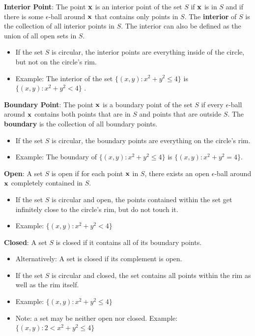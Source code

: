 \documentclass[]{book}
\providecommand{\tightlist}{%
  \setlength{\itemsep}{0pt}\setlength{\parskip}{0pt}}
\theoremstyle{definition}
\theoremstyle{definition}
\theoremstyle{definition}
\theoremstyle{remark}
\begin{document}
\textbf{Interior Point}: The point \(\bf x\) is an interior point of the set \(S\) if \(\bf x\) is in \(S\) and if there is some \(\epsilon\)-ball around \(\bf x\) that contains only points in \(S\). The \textbf{interior} of \(S\) is the collection of all interior points in \(S\). The interior can also be defined as the union of all open sets in \(S\).

\begin{itemize}
\tightlist
\item
  If the set \(S\) is circular, the interior points are everything inside of the circle, but not on the circle's rim.
\item
  Example: The interior of the set \(\{ (x,y) : x^2+y^2\le 4 \}\) is \(\{ (x,y) : x^2+y^2< 4 \}\) .
\end{itemize}

\textbf{Boundary Point}: The point \(\bf x\) is a boundary point of the set \(S\) if every \(\epsilon\)-ball around \(\bf x\) contains both points that are in \(S\) and points that are outside \(S\). The \textbf{boundary} is the collection of all boundary points.

\begin{itemize}
\tightlist
\item
  If the set \(S\) is circular, the boundary points are everything on the circle's rim.
\item
  Example: The boundary of \(\{ (x,y) : x^2+y^2\le 4 \}\) is \(\{ (x,y) : x^2+y^2 = 4 \}\).
\end{itemize}

\textbf{Open}: A set \(S\) is open if for each point \(\bf x\) in \(S\), there exists an open \(\epsilon\)-ball around \(\bf x\) completely contained in \(S\).

\begin{itemize}
\tightlist
\item
  If the set \(S\) is circular and open, the points contained within the set get infinitely close to the circle's rim, but do not touch it.
\item
  Example: \(\{ (x,y) : x^2+y^2<4 \}\)
\end{itemize}

\textbf{Closed}: A set \(S\) is closed if it contains all of its boundary points.

\begin{itemize}
\tightlist
\item
  Alternatively: A set is closed if its complement is open.
\item
  If the set \(S\) is circular and closed, the set contains all points within the rim as well as the rim itself.
\item
  Example: \(\{ (x,y) : x^2+y^2\le 4 \}\)
\item
  Note: a set may be neither open nor closed. Example: \(\{ (x,y) : 2 < x^2+y^2\le 4 \}\)
\end{itemize}
\end{document}
